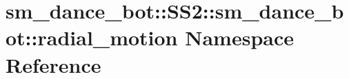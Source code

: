 \hypertarget{namespacesm__dance__bot_1_1SS2_1_1sm__dance__bot_1_1radial__motion}{}\section{sm\+\_\+dance\+\_\+bot\+:\+:S\+S2\+:\+:sm\+\_\+dance\+\_\+bot\+:\+:radial\+\_\+motion Namespace Reference}
\label{namespacesm__dance__bot_1_1SS2_1_1sm__dance__bot_1_1radial__motion}
